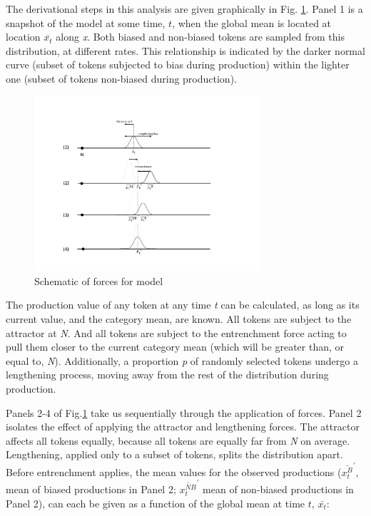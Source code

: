 The derivational steps in this analysis are given graphically in Fig.
\ref{fig:Derivation}. Panel 1 is a snapshot of the model at some
time, \emph{$t$}, when the global mean is located at location $\overline{x_{t}}$
along \emph{x}. Both biased and non-biased tokens are sampled from
this distribution, at different rates. This relationship is indicated
by the darker normal curve (subset of tokens subjected to bias during
production) within the lighter one (subset of tokens non-biased during
production). 

\begin{figure}[h]
\includegraphics[width=0.75\textwidth]{figures/Model1Behavior.pdf}\caption{\label{fig:Derivation}Schematic of forces for  model}
\end{figure}

The production value of any token at any time \emph{t} can be calculated,
as long as its current value, and the category mean, are known. All
tokens are subject to the attractor at \emph{N}. And all tokens are
subject to the entrenchment force acting to pull them closer to the
current category mean (which will be greater than, or equal to, \emph{N}).
Additionally, a proportion \emph{p} of randomly selected tokens undergo
a lengthening process, moving away from the rest of the distribution
during production.

Panels 2-4 of Fig.\ref{fig:Derivation} take us sequentially through
the application of forces. Panel 2 isolates the effect of applying
the attractor and lengthening forces. The attractor affects all tokens
equally, because all tokens are equally far from \emph{N} on average.
Lengthening, applied only to a subset of tokens, splits the distribution
apart. Before entrenchment applies, the mean values for the observed
productions ($\overline{x_{t}^{B}}^{\prime}$, mean of biased productions
in Panel 2; $\overline{x_{t}^{NB}}^{\prime}$ mean of non-biased productions
in Panel 2), can each be given as a function of the global mean at
time $t$, $\bar{x_{t}}$:

